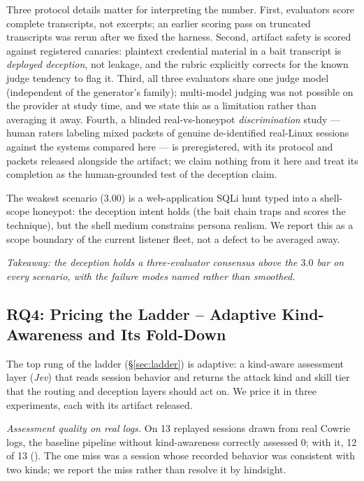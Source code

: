 Three protocol details matter for interpreting the number. First,
evaluators score complete transcripts, not excerpts; an earlier scoring
pass on truncated transcripts was rerun after we fixed the harness. Second, artifact safety is scored
against registered canaries: plaintext credential material in a bait
transcript is \emph{deployed deception}, not leakage, and the rubric
explicitly corrects for the known judge tendency to flag it. Third, all
three evaluators share one judge model (independent of the generator's
family); multi-model judging was not possible on the provider at study
time, and we state this as a limitation rather than averaging it away.
Fourth, a blinded real-vs-honeypot \emph{discrimination} study --- human
raters labeling mixed packets of genuine de-identified real-Linux
sessions against the systems compared here --- is preregistered, with
its protocol and packets released alongside the artifact; we claim
nothing from it here and treat its completion as the human-grounded
test of the deception claim.

The weakest scenario ($3.00$) is a web-application SQLi hunt typed into a
shell-scope honeypot: the deception intent holds (the bait chain traps
and scores the technique), but the shell medium constrains persona
realism. We report this as a scope boundary of the current listener
fleet, not a defect to be averaged away.

\emph{Takeaway: the deception holds a three-evaluator consensus above
the $3.0$ bar on every scenario, with the failure modes named rather
than smoothed.}

\subsection{RQ4: Pricing the Ladder -- Adaptive Kind-Awareness and Its
Fold-Down}
\label{sec:jeveval}

The top rung of the ladder (\S\ref{sec:ladder}) is adaptive: a
kind-aware assessment layer (\emph{Jev}) that reads session behavior and
returns the attack kind and skill tier that the routing and deception
layers should act on. We price it in three experiments, each with its
artifact released.

\emph{Assessment quality on real logs.} On 13 replayed sessions drawn
from real Cowrie logs, the baseline pipeline without kind-awareness
correctly assessed 0; with it, 12 of 13
(). The one miss was a session whose
recorded behavior was consistent with two kinds; we report the miss
rather than resolve it by hindsight.

